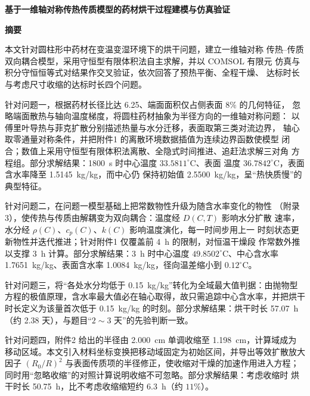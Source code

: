 \documentclass[12pt,a4paper]{article}
\begin{document}
\linespread{1.05}\selectfont


\setcounter{page}{1}

\begin{center}
{\bfseries 基于一维轴对称传热传质模型的药材烘干过程建模与仿真验证}

\begin{center}
\vspace{2ex}
{\bfseries 摘\quad 要}
\end{center}

\noindent 本文针对圆柱形中药材在变温变湿环境下的烘干问题，建立一维轴对称
传热--传质双向耦合模型，采用守恒型有限体积法自主求解，并以 COMSOL 有限元
仿真与积分守恒恒等式对结果作交叉验证，依次回答了预热平衡、全程干燥、
达标时长与考虑尺寸收缩的达标时长四个问题。

针对问题一，根据药材长径比达 6.25、端面面积仅占侧表面 $8\%$ 的几何特征，
忽略端面散热与轴向温度梯度，将圆柱药材抽象为半径方向的一维轴对称问题：
以傅里叶导热与菲克扩散分别描述热量与水分迁移，表面取第三类对流边界，
轴心取零通量对称条件，并把附件1 的离散环境数据插值为连续边界函数使模型
闭合；数值上采用守恒型有限体积法离散、全隐式时间推进、追赶法求解三对角
方程组。部分求解结果：1800~s 时中心温度 $33.5811^\circ\mathrm{C}$、表面
温度 $36.7842^\circ\mathrm{C}$，表面含水率降至 1.5145~kg/kg，而中心仍
保持初始值 2.5500~kg/kg，呈``热快质慢''的典型特征。

针对问题二，在问题一模型基础上把常数物性升级为随含水率变化的物性
（附录3），使传热与传质由解耦变为双向耦合：温度经 $D(C,T)$ 影响水分扩散
速率，水分经 $\rho(C)$、$c_p(C)$、$k(C)$ 影响温度演化，每一时间步用上一
时刻状态更新物性并迭代推进；针对附件1 仅覆盖前 4~h 的限制，对恒温干燥段
作常数外推以支撑 3~h 计算。部分求解结果：3~h 时中心温度
$49.8502^\circ\mathrm{C}$、中心含水率 1.7651~kg/kg、表面含水率
1.0084~kg/kg，径向温差缩小到 $0.12^\circ\mathrm{C}$。

针对问题三，将``各处水分均低于 0.15~kg/kg''转化为全域最大值判据：由抛物型
方程的极值原理，含水率最大值必在轴心取得，故只需追踪中心含水率，并把烘干
时长定义为该量首次低于 0.15~kg/kg 的时刻。部分求解结果：烘干时长 57.07~h
（约 2.38 天），与题目``$2\sim3$ 天''的先验判断一致。

针对问题四，附件2 给出的半径由 2.000~cm 单调收缩至 1.198~cm，计算域成为
移动区域。本文引入材料坐标变换把移动域固定为初始区间，并导出等效扩散放大
因子 $(R_0/R)^2$ 与表面传质项的半径修正，使收缩对干燥的加速作用进入方程；
同时用``忽略收缩''的对照计算说明收缩不可忽略。部分求解结果：考虑收缩时
烘干时长 50.75~h，比不考虑收缩缩短约 6.3~h（约 $11\%$）。


\end{center}
\end{document}
